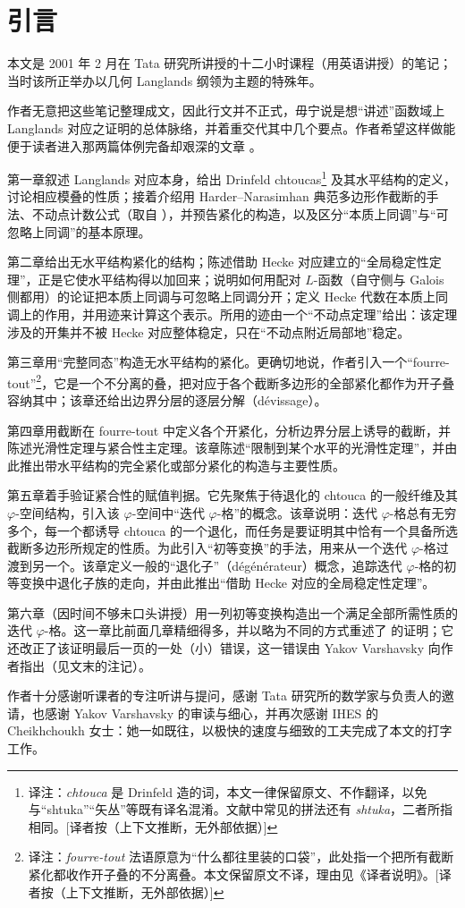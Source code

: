 
\section*{引言}

本文是 2001 年 2 月在 Tata 研究所讲授的十二小时课程（用英语讲授）的笔记；当时该所正举办以几何 Langlands 纲领为主题的特殊年。

作者无意把这些笔记整理成文，因此行文并不正式，毋宁说是想“讲述”函数域上 Langlands 对应之证明的总体脉络，并着重交代其中几个要点。作者希望这样做能便于读者进入那两篇体例完备却艰深的文章 \cite{lafforgue98,lafforgue02}。

第一章叙述 Langlands 对应本身，给出 Drinfeld chtoucas\footnote{译注：\emph{chtouca} 是 Drinfeld 造的词，本文一律保留原文、不作翻译，以免与“shtuka”“矢丛”等既有译名混淆。文献中常见的拼法还有 \emph{shtuka}，二者所指相同。[译者按（上下文推断，无外部依据）]} 及其水平结构的定义，讨论相应模叠的性质；接着介绍用 Harder--Narasimhan 典范多边形作截断的手法、不动点计数公式（取自 \cite{lafforgue97}），并预告紧化的构造，以及区分“本质上同调”与“可忽略上同调”的基本原理。

第二章给出无水平结构紧化的结构；陈述借助 Hecke 对应建立的“全局稳定性定理”，正是它使水平结构得以加回来；说明如何用配对 $L$-函数（自守侧与 Galois 侧都用）的论证把本质上同调与可忽略上同调分开；定义 Hecke 代数在本质上同调上的作用，并用迹来计算这个表示。所用的迹由一个“不动点定理”给出：该定理涉及的开集并不被 Hecke 对应整体稳定，只在“不动点附近局部地”稳定。

第三章用“完整同态”构造无水平结构的紧化。更确切地说，作者引入一个“fourre-tout”\footnote{译注：\emph{fourre-tout} 法语原意为“什么都往里装的口袋”，此处指一个把所有截断紧化都收作开子叠的不分离叠。本文保留原文不译，理由见《译者说明》。[译者按（上下文推断，无外部依据）]}，它是一个不分离的叠，把对应于各个截断多边形的全部紧化都作为开子叠容纳其中；该章还给出边界分层的逐层分解（dévissage）。

第四章用截断在 fourre-tout 中定义各个开紧化，分析边界分层上诱导的截断，并陈述光滑性定理与紧合性主定理。该章陈述“限制到某个水平的光滑性定理”，并由此推出带水平结构的完全紧化或部分紧化的构造与主要性质。

第五章着手验证紧合性的赋值判据。它先聚焦于待退化的 chtouca 的一般纤维及其 $\varphi$-空间结构，引入该 $\varphi$-空间中“迭代 $\varphi$-格”的概念。该章说明：迭代 $\varphi$-格总有无穷多个，每一个都诱导 chtouca 的一个退化，而任务是要证明其中恰有一个具备所选截断多边形所规定的性质。为此引入“初等变换”的手法，用来从一个迭代 $\varphi$-格过渡到另一个。该章定义一般的“退化子”（dégénérateur）概念，追踪迭代 $\varphi$-格的初等变换中退化子族的走向，并由此推出“借助 Hecke 对应的全局稳定性定理”。

第六章（因时间不够未口头讲授）用一列初等变换构造出一个满足全部所需性质的迭代 $\varphi$-格。这一章比前面几章精细得多，并以略为不同的方式重述了 \cite{lafforgue98} 的证明；它还改正了该证明最后一页的一处（小）错误，这一错误由 Yakov Varshavsky 向作者指出（见文末的注记）。

作者十分感谢听课者的专注听讲与提问，感谢 Tata 研究所的数学家与负责人的邀请，也感谢 Yakov Varshavsky 的审读与细心，并再次感谢 IHES 的 Cheikhchoukh 女士：她一如既往，以极快的速度与细致的工夫完成了本文的打字工作。
